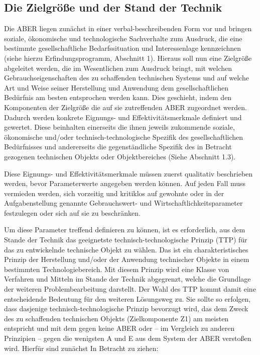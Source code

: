\documentclass[12pt,a4paper]{article}
\begin{document}
\subsection{Die Zielgröße und der Stand der Technik}

Die ABER liegen zunächst in einer verbal-beschreibenden Form vor und bringen
soziale, ökonomische und technologische Sachverhalte zum Ausdruck, die eine
bestimmte gesellschaftliche Bedarfssituation und Interessenlage kennzeichnen
(siehe hierzu Erfindungsprogramm, Abschnitt 1). Hieraus soll nun eine
Zielgröße abgeleitet werden, die im Wesentlichen zum Ausdruck bringt, mit
welchen Gebrauchseigenschaften des zu schaffenden technischen Systems und auf
welche Art und Weise seiner Herstellung und Anwendung dem gesellschaftlichen
Bedürfnis am besten entsprochen werden kann. Dies geschieht, indem den
Komponenten der Zielgröße die auf sie zutreffenden ABER zugeordnet
werden. Dadurch werden konkrete Eignungs- und Effektivitätsmerkmale definiert
und gewertet. Diese beinhalten einerseits die ihnen jeweils zukommende
soziale, ökonomische und/oder technisch-technologische Spezifik des
gesellschaftlichen Bedürfnisses und andererseits die gegenständliche Spezifik
des in Betracht gezogenen technischen Objekts oder Objektbereiches (Siehe
Abschnitt 1.3).

Diese Eignungs- und Effektivitätsmerkmale müssen zuerst qualitativ beschrieben
werden, bevor Parameterwerte angegeben werden können. Auf jeden Fall muss
vermieden werden, sich vorzeitig und kritiklos auf gewohnte oder in der
Aufgabenstellung genannte Gebrauchswert- und Wirtschaftlichkeitsparameter
festzulegen oder sich auf sie zu beschränken.

Um diese Parameter treffend definieren zu können, ist es erforderlich, aus dem
Stande der Technik das geeignetste technisch-technologische Prinzip (TTP) für
das zu entwickelnde technische Objekt zu wählen. Das ist ein
charakteristisches Prinzip der Herstellung und/oder der Anwendung technischer
Objekte in einem bestimmten Technologiebereich. Mit diesem Prinzip wird eine
Klasse von Verfahren und Mitteln im Stande der Technik abgegrenzt, welche die
Grundlage der weiteren Problembearbeitung darstellt. Der Wahl des TTP kommt
damit eine entscheidende Bedeutung für den weiteren Lösungsweg zu. Sie sollte
so erfolgen, dass dasjenige technisch-technologische Prinzip bevorzugt wird,
das dem Zweck des zu schaffenden technischen Objekts (Zielkomponente Z1) am
meisten entspricht und mit dem gegen keine ABER oder -- im Vergleich zu anderen
Prinzipien -- gegen die wenigsten A und E aus dem System der ABER verstoßen
wird. Hierfür sind zunächst In Betracht zu ziehen:
\end{document}
